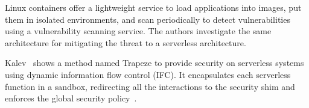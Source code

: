 Linux containers offer a lightweight service to load applications into images, put them in isolated environments, and scan periodically to detect vulnerabilities using a vulnerability scanning service. The authors \cite{bila2017serverless} investigate the same architecture for mitigating the threat to a serverless architecture.


Kalev \etal\ shows a method named Trapeze to provide security on serverless systems using dynamic information flow control (IFC). It encapsulates each serverless function in a sandbox, redirecting all the interactions to the security shim and enforces the global security policy~\cite{alpernas2018}. 

